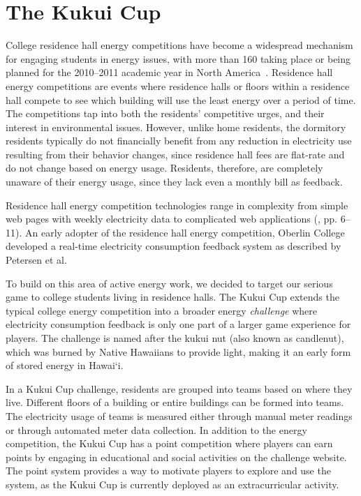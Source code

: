 \documentclass[10pt, conference, compsocconf]{IEEEtran}
\newcommand{\Hawaii}{Hawai`i\xspace}
\begin{document}
\section{The Kukui Cup}

College residence hall energy competitions have become a widespread mechanism for engaging students in energy issues, with more than 160 taking place or being planned for the 2010--2011 academic year in North America~\cite{Hodge2010}. Residence hall energy competitions are events where residence halls or floors within a residence hall compete to see which building will use the least energy over a period of time. The competitions tap into both the residents' competitive urges, and their interest in environmental issues. However, unlike home residents, the dormitory residents typically do not financially benefit from any reduction in electricity use resulting from their behavior changes, since residence hall fees are flat-rate and do not change based on energy usage. Residents, therefore, are completely unaware of their energy usage, since they lack even a monthly bill as feedback.

Residence hall energy competition technologies range in complexity from simple web pages with weekly electricity data to complicated web applications (\cite{csdl2-11-01}, pp. 6--11). An early adopter of the residence hall energy competition, Oberlin College developed a real-time electricity consumption feedback system as described by Petersen et al.~\cite{petersen-dorm-energy-reduction}

To build on this area of active energy work, we decided to target our serious game to college students living in residence halls. The Kukui Cup extends the typical college energy competition into a broader energy \emph{challenge} where electricity consumption feedback is only one part of a larger game experience for players. The challenge is named after the kukui nut (also known as candlenut), which was burned by Native Hawaiians to provide light, making it an early form of stored energy in \Hawaii.

In a Kukui Cup challenge, residents are grouped into teams based on where they live. Different floors of a building or entire buildings can be formed into teams. The electricity usage of teams is measured either through manual meter readings or through automated meter data collection. In addition to the energy competition, the Kukui Cup has a point competition where players can earn points by engaging in educational and social activities on the challenge website. The point system provides a way to motivate players to explore and use the system, as the Kukui Cup is currently deployed as an extracurricular activity.
\end{document}
